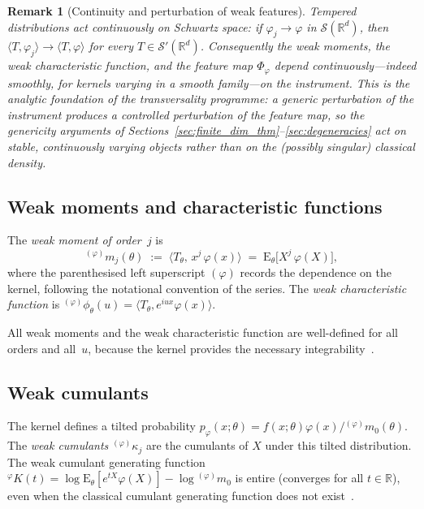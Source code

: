 \documentclass[11pt,a4paper]{article}
\newtheorem{remark}[theorem]{Remark}
\newcommand{\E}{\mathrm{E}}
\newcommand{\R}{\mathbb{R}}
\newcommand{\cS}{\mathcal{S}}
\newcommand{\wm}[1]{{}^{(\varphi)}\!m_{#1}}
\newcommand{\wk}[1]{{}^{(\varphi)}\!\kappa_{#1}}
\begin{document}
\begin{remark}[Continuity and perturbation of weak features]
\label{rem:continuity_perturbation}
Tempered distributions act \emph{continuously} on Schwartz space: if
$\varphi_j\to\varphi$ in $\cS(\R^d)$, then
$\langle T,\varphi_j\rangle\to\langle T,\varphi\rangle$ for every
$T\in\cS'(\R^d)$.  Consequently the weak moments, the weak characteristic
function, and the feature map $\Phi_\varphi$ depend continuously---indeed
smoothly, for kernels varying in a smooth family---on the instrument.  This
is the analytic foundation of the transversality programme: a generic
perturbation of the instrument produces a controlled perturbation of the
feature map, so the genericity arguments of
Sections~\ref{sec:finite_dim_thm}--\ref{sec:degeneracies} act on stable,
continuously varying objects rather than on the (possibly singular) classical
density.
\end{remark}

\subsection{Weak moments and characteristic functions}

The \emph{weak moment of order~$j$} is
\[
  \wm{j}(\theta)
  \;:=\;
  \langle T_\theta,\, x^j\,\varphi(x)\rangle
  \;=\;
  \E_\theta\bigl[X^j\,\varphi(X)\bigr],
\]
where the parenthesised left superscript $(\varphi)$ records the
dependence on the kernel, following the notational convention of the
series.  The \emph{weak characteristic function} is
${}^{(\varphi)}\phi_\theta(u) = \langle T_\theta, e^{iux}\varphi(x)
\rangle$.

All weak moments and the weak characteristic function are
well-defined for all orders and all~$u$, because the kernel provides
the necessary integrability~\cite[Proposition~2.17]{A}.

\subsection{Weak cumulants}

The kernel defines a tilted probability
$p_\varphi(x;\theta) = f(x;\theta)\varphi(x)/\wm{0}(\theta)$.
The \emph{weak cumulants} $\wk{j}$ are the cumulants of $X$ under
this tilted distribution.  The weak cumulant generating function
${}^\varphi\!K(t) = \log\E_\theta[e^{tX}\varphi(X)] - \log\wm{0}$
is entire (converges for all $t\in\R$), even when the classical
cumulant generating function does not exist~\cite{D}.
\end{document}
